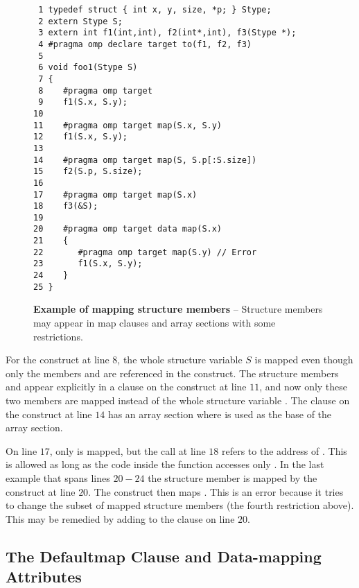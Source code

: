 \begin{figure*}[!tb]
\begin{verbatim}
 1 typedef struct { int x, y, size, *p; } Stype;
 2 extern Stype S;
 3 extern int f1(int,int), f2(int*,int), f3(Stype *);
 4 #pragma omp declare target to(f1, f2, f3) 
 5 
 6 void foo1(Stype S)
 7 {
 8    #pragma omp target
 9    f1(S.x, S.y);
10 
11    #pragma omp target map(S.x, S.y)
12    f1(S.x, S.y);
13 
14    #pragma omp target map(S, S.p[:S.size])
15    f2(S.p, S.size);
16 
17    #pragma omp target map(S.x)
18    f3(&S);
19 
20    #pragma omp target data map(S.x)
21    {
22       #pragma omp target map(S.y) // Error
23       f1(S.x, S.y);
24    }
25 }
\end{verbatim}
\caption{ \textbf {Example of mapping structure members} -- \small
          Structure members may appear in map clauses and array sections with some
          restrictions.
         }
\label{figure:chapter6-mapstruct}
\end{figure*}

For the  construct at line $8$, the whole structure variable $S$
is mapped even though only the members  and  are referenced in the
construct.  The structure members  and  appear explicitly in
a  clause on the  construct at line $11$, and now only
these two members are mapped instead of the whole structure variable .  The
 clause on the  construct at line $14$ has an array
section where  is used as the base of the array section.

On line $17$, only  is mapped, but the call at line $18$ refers to the
address of .  This is allowed as long as the code inside the function 
accesses only .  In the last example that spans lines $20-24$ the structure
member  is mapped by the ~ construct at line
$20$.  The  construct then maps .  This is an error because
it tries to change the subset of mapped structure members (the fourth
restriction above).  This may be remedied by adding  to the 
clause on line $20$.

\subsection{The Defaultmap Clause and Data-mapping Attributes}
\label{ssec:06.defaultmap-clause}

